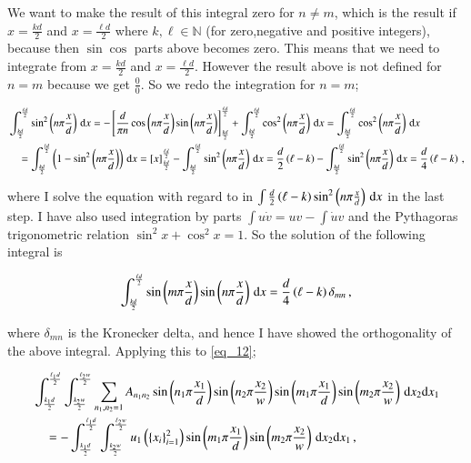 \documentclass[11pt,english,a4paper]{article}
\begin{document}
\begin{flushleft}
We want to make the result of this integral zero for $n\neq m$, which is the result if $x=\frac{k d}{2}$ and $x=\frac{\ell d}{2}$ where $k,\ell\in\mathbb{N}$ (for zero,negative and positive integers), because then $\sin\cos$ parts above becomes zero. This means that we need to integrate from $x=\frac{k d}{2}$ and $x=\frac{\ell d}{2}$. However the result above is not defined for $n=m$ because we get $\frac{0}{0}$. So we redo the integration for $n=m$;

\begin{align*}
&\int_{\frac{k d}{2}}^{\frac{\ell d}{2}} \sin^2\left({n\pi\frac{x}{d}}\right)\,\mathrm{d}x 
= -\left[{ \frac{d}{\pi n}\cos\left({n\pi\frac{x}{d}}\right)\sin\left({n\pi\frac{x}{d}}\right)}\right]_{\frac{k d}{2}}^{\frac{\ell d}{2}} + \int_{\frac{k d}{2}}^{\frac{\ell d}{2}} \cos^2\left({n\pi\frac{x}{d}}\right)\,\mathrm{d}x
= \int_{\frac{k d}{2}}^{\frac{\ell d}{2}}  \cos^2\left({n\pi\frac{x}{d}}\right)\,\mathrm{d}x
\\ 
&\quad = \int_{\frac{k d}{2}}^{\frac{\ell d}{2}}  \left({1-\sin^2\left({n\pi\frac{x}{d}}\right)}\right)\,\mathrm{d}x 
= \left[{x}\right]_{\frac{k d}{2}}^{\frac{\ell d}{2}} - \int_{\frac{k d}{2}}^{\frac{\ell d}{2}}  \sin^2\left({n\pi\frac{x}{d}}\right)\,\mathrm{d}x 
= \frac{d}{2}\left({\ell-k}\right) - \int_{\frac{k d}{2}}^{\frac{\ell d}{2}}  \sin^2\left({n\pi\frac{x}{d}}\right)\,\mathrm{d}x 
= \frac{d}{4}\left({\ell-k}\right) \,,
\end{align*}

where I solve the equation with regard to in $\int\frac{d}{2}\left({\ell-k}\right) \sin^2\left({n\pi\frac{x}{d}}\right)\,\mathrm{d}x$ in the last step. I have also used integration by parts $\int u\dot{v} = uv - \int \dot{u}v$ and the Pythagoras trigonometric relation $\sin^2 x+ \cos^2 x = 1$. So the solution of the following integral is

\begin{align*}
\int_{\frac{k d}{2}}^{\frac{\ell d}{2}} \sin\left({m\pi\frac{x}{d}}\right)\sin\left({n\pi\frac{x}{d}}\right)\,\mathrm{d}x = \frac{d}{4}\left({\ell-k}\right)\delta_{mn}\,,
\end{align*}

where $\delta_{mn}$ is the Kronecker delta, and hence I have showed the orthogonality of the above integral. Applying this to \eqref{eq_12};

\begin{align*}
&\int_{\frac{k_1 d}{2}}^{\frac{\ell_1 d}{2}}\int_{\frac{k_2 w}{2}}^{\frac{\ell_2 w}{2}}  \sum_{n_1,n_2=1}A_{n_1 n_2} \sin\left({n_1\pi \frac{x_1}{d}}\right) \sin\left({n_2\pi \frac{x_2}{w}}\right)\sin\left({m_1\pi\frac{x_1}{d}}\right)\sin\left({m_2\pi\frac{x_2}{w}}\right)\,\mathrm{d}x_2\mathrm{d}x_1 
\\
& \quad = - \int_{\frac{k_1 d}{2}}^{\frac{\ell_1 d}{2}}\int_{\frac{k_2 w}{2}}^{\frac{\ell_2 w}{2}} u_1\left({\left\lbrace{x_i}\right\rbrace_{i=1}^2}\right)\sin\left({m_1\pi\frac{x_1}{d}}\right)\sin\left({m_2\pi\frac{x_2}{w}}\right)\,\mathrm{d}x_2\mathrm{d}x_1\,,
\end{align*}


\end{flushleft}
\end{document}
